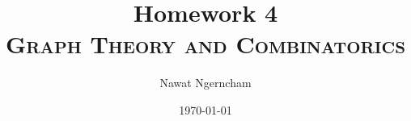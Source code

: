 \documentclass[answers]{exam}
\title{\Huge{Homework 4}
	\\
\Large\scshape{Graph Theory and Combinatorics}}
\author{Nawat Ngerncham}
\date{\today}
\begin{document}
\maketitle
\begin{questions}
  
  
  
  
  
  
\end{questions}
% 
% 
\end{document}

